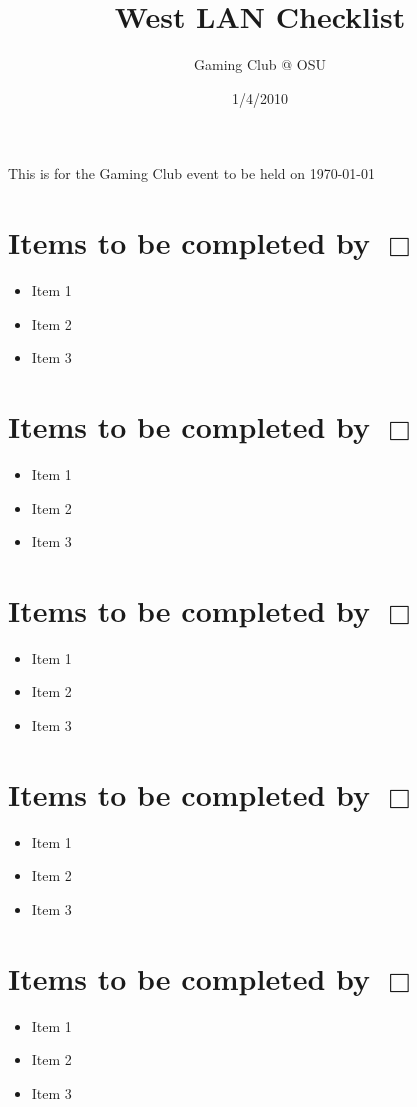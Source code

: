 \documentclass[12pt,letterpaper,draft,titlepage]{article}
\author{Gaming Club @ OSU}
\title{West LAN Checklist}
\date{1/4/2010}
\begin{document}
\SetDate[1/4/2010]
\maketitle

This is for the Gaming Club event to be held on \today
\tableofcontents

\section{Items to be completed by \DayAfter[-60] $\Box$}
\begin{itemize}
\item Item 1
\item Item 2
\item Item 3
\end{itemize}

\section{Items to be completed by \DayAfter[-45] $\Box$}
\begin{itemize}
\item Item 1
\item Item 2
\item Item 3
\end{itemize}

\section{Items to be completed by \DayAfter[-30] $\Box$}
\begin{itemize}
\item Item 1
\item Item 2
\item Item 3
\end{itemize}

\section{Items to be completed by \DayAfter[-28] $\Box$}
\begin{itemize}
\item Item 1
\item Item 2
\item Item 3
\end{itemize}

\section{Items to be completed by \DayAfter[-21] $\Box$}
\begin{itemize}
\item Item 1
\item Item 2
\item Item 3
\end{itemize}
\end{document}
